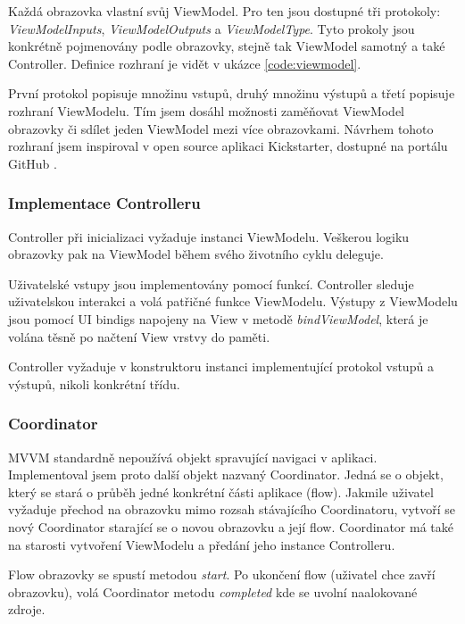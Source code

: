 Každá obrazovka vlastní svůj ViewModel.
Pro ten jsou dostupné tři protokoly: \textit{ViewModelInputs}, \textit{ViewModelOutputs} a \textit{ViewModelType}.
Tyto prokoly jsou konkrétně pojmenovány podle obrazovky, stejně tak ViewModel samotný a také Controller.
Definice rozhraní je vidět v ukázce \ref{code:viewmodel}.


První protokol popisuje množinu vstupů, druhý množinu výstupů a třetí popisuje rozhraní ViewModelu.
Tím jsem dosáhl možnosti zaměňovat ViewModel obrazovky či sdílet jeden ViewModel mezi více obrazovkami.
Návrhem tohoto rozhraní jsem inspiroval v open source aplikaci Kickstarter, dostupné na portálu GitHub \cite{github-kickstarter}.

\subsubsection*{Implementace Controlleru}

Controller při inicializaci vyžaduje instanci ViewModelu.
Veškerou logiku obrazovky pak na ViewModel během svého životního cyklu deleguje.

Uživatelské vstupy jsou implementovány pomocí funkcí.
Controller sleduje uživatelskou interakci a volá patřičné funkce ViewModelu.
Výstupy z ViewModelu jsou pomocí UI bindigs napojeny na View v metodě \textit{bindViewModel}, která je volána těsně po načtení View vrstvy do paměti.

Controller vyžaduje v konstruktoru instanci implementující protokol vstupů a výstupů, nikoli konkrétní třídu.

\subsubsection*{Coordinator}

MVVM standardně nepoužívá objekt spravující navigaci v aplikaci.
Implementoval jsem proto další objekt nazvaný Coordinator.
Jedná se o objekt, který se stará o průběh jedné konkrétní části aplikace (flow).
Jakmile uživatel vyžaduje přechod na obrazovku mimo rozsah stávajícího Coordinatoru, vytvoří se nový Coordinator starající se o novou obrazovku a její flow.
Coordinator má také na starosti vytvoření ViewModelu a předání jeho instance Controlleru.

Flow obrazovky se spustí metodou \textit{start}.
Po ukončení flow (uživatel chce zavří obrazovku), volá Coordinator metodu \textit{completed} kde se uvolní naalokované zdroje.

